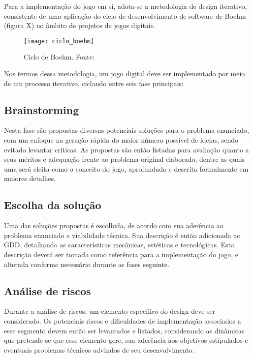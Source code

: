 Para a implementação do jogo em si, adota-se a metodologia de design iterativo, consistente de uma aplicação do ciclo de desenvolvimento de software de Boehm (figura X) no âmbito de projetos de jogos digitais.

\begin{figure}[h]
	\centering
	\texttt{[image: ciclo\_boehm]}
	\caption{Ciclo de Boehm. Fonte: \cite{schell:2010:art_game_design}}
\end{figure}

Nos termos dessa metodologia, um jogo digital deve ser implementado por meio de um processo iterativo, ciclando entre seis fase principais:

\subsection{Brainstorming}\label{subsec-met-brainstorming}

Nesta fase são propostas diversas potenciais soluções para o problema enunciado, com um enfoque na geração rápida do maior número possível de ideias, sendo evitado levantar críticas. As propostas são então listadas para avaliação quanto a seus méritos e adequação frente ao problema original elaborado, dentre as quais uma será eleita como o conceito do jogo, aprofundada e descrita formalmente em maiores detalhes.

\subsection{Escolha da solução}\label{subsec-met-escolha-solucao}

Uma das soluções propostas é escolhida, de acordo com sua aderência ao problema enunciado e viabilidade técnica. Sua descrição é então adicionada ao GDD, detalhando as características mecânicas, estéticas e tecnológicas. Esta descrição deverá ser tomada como referência para a implementação do jogo, e alterada conforme necessário durante as fases seguinte.

\subsection{Análise de riscos}\label{subsec-met-analise-riscos}

Durante a análise de riscos, um elemento específico do design deve ser considerado. Os potenciais riscos e dificuldades de implementação associados a esse segmento devem então ser levantados e listados, considerando as dinâmicas que pretende-se que esse elemento gere, sua aderência aos objetivos estipulados e eventuais problemas técnicos advindos de seu desenvolvimento.

